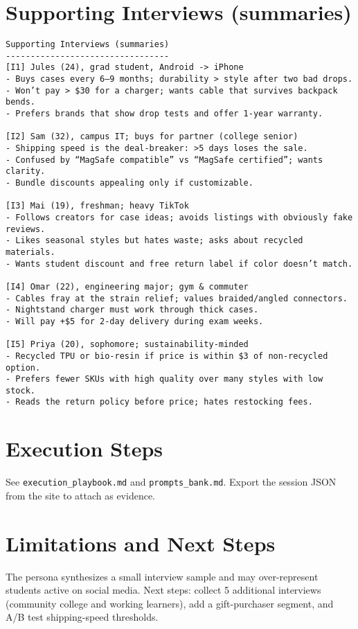 \documentclass[11pt]{article}
\begin{document}
\section*{Supporting Interviews (summaries)}
\small
\begin{verbatim}
Supporting Interviews (summaries)
---------------------------------
[I1] Jules (24), grad student, Android -> iPhone
- Buys cases every 6–9 months; durability > style after two bad drops.
- Won’t pay > $30 for a charger; wants cable that survives backpack bends.
- Prefers brands that show drop tests and offer 1‑year warranty.

[I2] Sam (32), campus IT; buys for partner (college senior)
- Shipping speed is the deal‑breaker: >5 days loses the sale.
- Confused by “MagSafe compatible” vs “MagSafe certified”; wants clarity.
- Bundle discounts appealing only if customizable.

[I3] Mai (19), freshman; heavy TikTok
- Follows creators for case ideas; avoids listings with obviously fake reviews.
- Likes seasonal styles but hates waste; asks about recycled materials.
- Wants student discount and free return label if color doesn’t match.

[I4] Omar (22), engineering major; gym & commuter
- Cables fray at the strain relief; values braided/angled connectors.
- Nightstand charger must work through thick cases.
- Will pay +$5 for 2‑day delivery during exam weeks.

[I5] Priya (20), sophomore; sustainability‑minded
- Recycled TPU or bio‑resin if price is within $3 of non‑recycled option.
- Prefers fewer SKUs with high quality over many styles with low stock.
- Reads the return policy before price; hates restocking fees.
\end{verbatim}
\normalsize

\section*{Execution Steps}
See \texttt{execution\_playbook.md} and \texttt{prompts\_bank.md}. Export the session JSON from the site to attach as evidence. 

\section*{Limitations and Next Steps}
The persona synthesizes a small interview sample and may over-represent students active on social media. Next steps: collect 5 additional interviews (community college and working learners), add a gift-purchaser segment, and A/B test shipping-speed thresholds.
\end{document}
